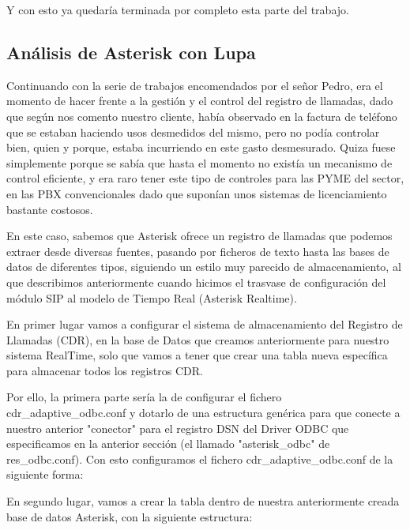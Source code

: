 Y con esto ya quedaría terminada por completo esta parte del trabajo.

\subsection{Análisis de Asterisk con Lupa}

Continuando con la serie de trabajos encomendados por el señor Pedro, era el momento de hacer frente a la gestión y el control del registro de llamadas, dado que según nos comento nuestro cliente, había observado en la factura de teléfono que se estaban haciendo usos desmedidos del mismo, pero no podía controlar bien, quien y porque, estaba incurriendo en este gasto desmesurado. Quiza fuese simplemente porque se sabía que hasta el momento no existía un mecanismo de control eficiente, y era raro tener este tipo de controles para las PYME del sector, en las PBX convencionales dado que suponían unos sistemas de licenciamiento bastante costosos.

En este caso, sabemos que Asterisk ofrece un registro de llamadas que podemos extraer desde diversas fuentes, pasando por ficheros de texto hasta las bases de datos de diferentes tipos, siguiendo un estilo muy parecido de almacenamiento, al que describimos anteriormente cuando hicimos el trasvase de configuración del módulo SIP al modelo de Tiempo Real (Asterisk Realtime).

En primer lugar vamos a configurar el sistema de almacenamiento del Registro de Llamadas (CDR), en la base de Datos que creamos anteriormente para nuestro sistema RealTime, solo que vamos a tener que crear una tabla nueva específica para almacenar todos los registros CDR.

Por ello, la primera parte sería la de configurar el fichero cdr\_adaptive\_odbc.conf y dotarlo de una estructura genérica para que conecte a nuestro anterior "conector" para el registro DSN del Driver ODBC que especificamos en la anterior sección (el llamado "asterisk\_odbc" de res\_odbc.conf). Con esto configuramos el fichero cdr\_adaptive\_odbc.conf de la siguiente forma:



En segundo lugar, vamos a crear la tabla dentro de nuestra anteriormente creada base de datos Asterisk, con la siguiente estructura:



